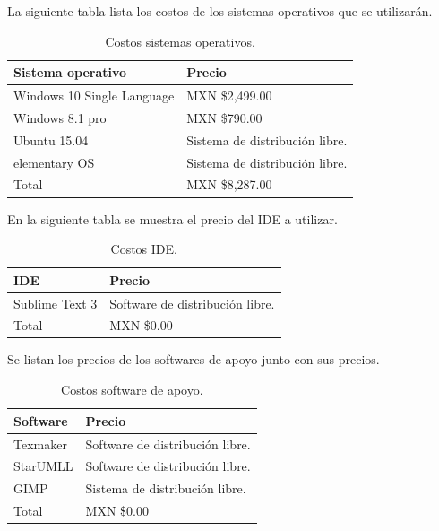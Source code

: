 \documentclass[12pt]{report}
\begin{document}
La siguiente tabla lista los costos de los sistemas operativos que se utilizarán.

\begin{table}[H]
\begin{center}
\begin{tabular}{p{60mm}p{60mm}}
\hline
Sistema operativo & Precio \\
\hline \hline 
Windows 10 Single Language & MXN \$2,499.00\cite{prewd}\\
Windows 8.1 pro & MXN \$790.00\cite{prewo}\\
Ubuntu 15.04 & Sistema de distribución libre.\cite{preubu}\\
elementary OS & Sistema de distribución libre.\cite{preele}\\
\hline \hline
Total & MXN \$8,287.00\\
\hline
\end{tabular}
\caption{Costos sistemas operativos.}
\end{center}
\end{table}

En la siguiente tabla se muestra el precio del IDE a utilizar.
\begin{table}[H]
\begin{center}
\begin{tabular}{p{40mm}p{65mm}}
\hline
IDE & Precio \\
\hline \hline 
Sublime Text 3 & Software de distribución libre.\cite{subli}\\
\hline \hline
Total & MXN \$0.00\\
\hline
\end{tabular}
\caption{Costos IDE.}
\end{center}
\end{table}

Se listan los precios de los softwares de apoyo junto con sus precios.

\begin{table}[H]
\begin{center}
\begin{tabular}{p{40mm}p{65mm}}
\hline
Software & Precio \\
\hline \hline 
Texmaker & Software de distribución libre.\cite{texm}\\
StarUMLL & Software de distribución libre.\cite{star}\\
GIMP & Sistema de distribución libre.\cite{gimp}\\
\hline \hline
Total & MXN \$0.00\\
\hline
\end{tabular}
\caption{Costos software de apoyo.}
\end{center}
\end{table}
\end{document}
